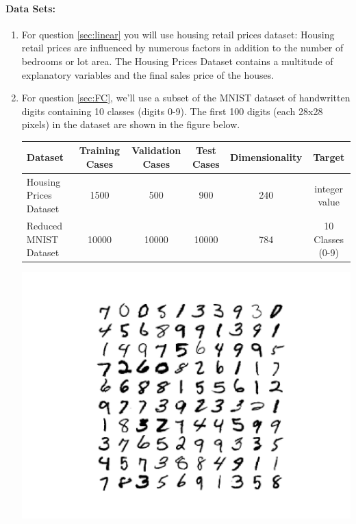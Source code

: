 \documentclass[letterpaper]{article}
\begin{document}
\paragraph*{Data Sets:} 
\begin{enumerate}
    \item For question \ref{sec:linear} you will use housing retail prices dataset: Housing retail prices are influenced by numerous factors in addition to the number of bedrooms or lot area. The Housing Prices Dataset contains a multitude of explanatory variables and the final sales price of the houses. \vspace{12pt}
    
    \item For question \ref{sec:FC}, we'll use a subset of the MNIST dataset of handwritten digits containing 10 classes (digits 0-9). The first 100 digits (each 28x28 pixels) in the dataset are shown in the figure below.  \vspace{12pt}


\begin{table}[h!]
\center
\begin{tabular}{|l|c|c|c|c|c|}\hline
Dataset & Training Cases & Validation Cases & Test Cases & Dimensionality & Target \\\hline\hline
Housing Prices Dataset & 1500 & 500   & 900 & 240 & integer value \\\hline
Reduced MNIST Dataset & 10000 & 10000 & 10000 & 784 & 10 Classes (0-9) \\\hline
\end{tabular}
\end{table}
\begin{center}
    \includegraphics[scale=0.5]{mnist.png}
\end{center}
\end{enumerate}
\end{document}
